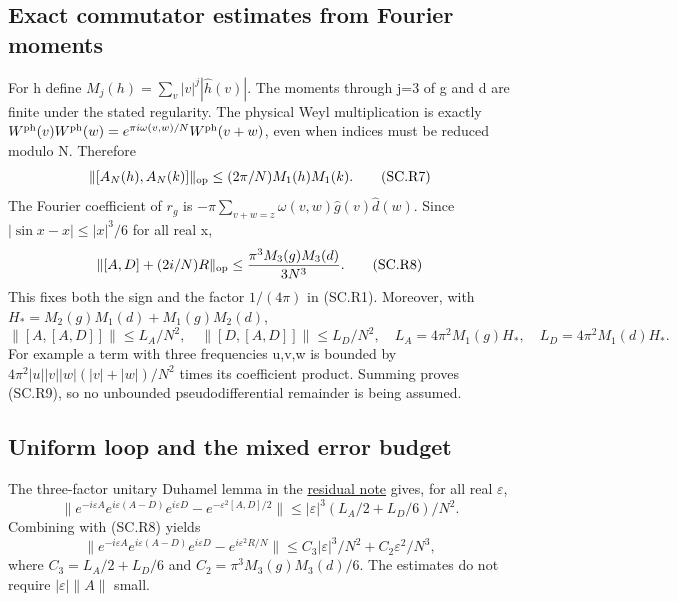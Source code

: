 \subsection{Exact commutator estimates from Fourier moments}\label{smooth_residual:exact-commutator-estimates-from-fourier-moments}

For h define \(M_j(h)=\sum_v|v|^j|\widehat h(v)|\). The moments through j=3 of g and d are finite under the stated regularity. The physical Weyl multiplication is exactly \(W^{\rm ph}(v)W^{\rm ph}(w)=e^{\pi i\omega(v,w)/N}W^{\rm ph}(v+w)\), even when indices must be reduced modulo N. Therefore \[
 \|[A_N(h),A_N(k)]\|_{\rm op}
                  \leq(2\pi/N)M_1(h)M_1(k).                 \tag{SC.R7}
\] The Fourier coefficient of \(r_{g}\) is \(-\pi\sum_{v+w=z}\omega(v,w)\widehat g(v)\widehat d(w)\). Since \(|\sin x-x|\leq|x|^3/6\) for all real x, \[
 \|[A,D]+(2i/N)R\|_{\rm op}
          \leq\frac{\pi^3M_3(g)M_3(d)}{3N^3}.               \tag{SC.R8}
\] This fixes both the sign and the factor \(1/(4\pi)\) in (SC.R1). Moreover, with \(H_*=M_2(g)M_1(d)+M_1(g)M_2(d)\), \[
 \|[A,[A,D]]\|\leq L_A/N^2,\quad
 \|[D,[A,D]]\|\leq L_D/N^2,
 \quad L_A=4\pi^2M_1(g)H_*,\quad L_D=4\pi^2M_1(d)H_*.        \tag{SC.R9}
\] For example a term with three frequencies u,v,w is bounded by \(4\pi^2|u||v||w|(|v|+|w|)/N^2\) times its coefficient product. Summing proves (SC.R9), so no unbounded pseudodifferential remainder is being assumed.

\subsection{Uniform loop and the mixed error budget}\label{smooth_residual:uniform-loop-and-the-mixed-error-budget}

The three-factor unitary Duhamel lemma in the \hyperref[sec:coboundary]{residual note} gives, for all real \(\varepsilon\), \[
 \|e^{-i\varepsilon A}e^{i\varepsilon(A-D)}e^{i\varepsilon D}
                         -e^{-\varepsilon^2[A,D]/2}\|
  \leq|\varepsilon|^3(L_A/2+L_D/6)/N^2.
\] Combining with (SC.R8) yields \[
 \|e^{-i\varepsilon A}e^{i\varepsilon(A-D)}e^{i\varepsilon D}
                           -e^{i\varepsilon^2R/N}\|
 \leq C_3|\varepsilon|^3/N^2+C_2\varepsilon^2/N^3,             \tag{SC.R10}
\] where \(C_3=L_A/2+L_D/6\) and \(C_2=\pi^3M_3(g)M_3(d)/6\). The estimates do not require \(|\varepsilon|\|A\|\) small.

